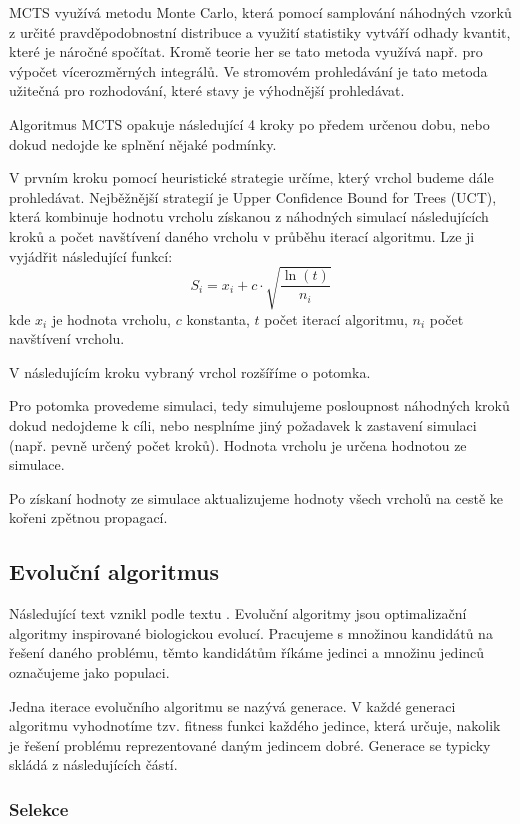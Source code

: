 MCTS využívá metodu Monte Carlo, která pomocí samplování náhodných vzorků z  určité pravděpodobnostní distribuce a využití statistiky vytváří odhady kvantit, které je náročné spočítat. Kromě teorie her se tato metoda využívá např. pro výpočet vícerozměrných integrálů. Ve stromovém prohledávání je tato metoda užitečná pro rozhodování, které stavy je výhodnější prohledávat.

Algoritmus MCTS opakuje následující 4 kroky po předem určenou dobu, nebo dokud nedojde ke splnění nějaké podmínky.

V prvním kroku pomocí heuristické strategie určíme, který vrchol budeme dále prohledávat. Nejběžnější strategií je Upper Confidence Bound for Trees (UCT), která kombinuje hodnotu vrcholu získanou z náhodných simulací následujících kroků a počet navštívení daného vrcholu v průběhu iterací algoritmu. Lze ji vyjádřit následující funkcí:
\begin{equation}
    S_i = x_i + c \cdot \sqrt{\frac{\ln(t)}{n_i}}
\end{equation}
kde $x_i$ je hodnota vrcholu, $c$ konstanta, $t$ počet iterací algoritmu, $n_i$ počet navštívení vrcholu.

V následujícím kroku vybraný vrchol rozšíříme o potomka.

Pro potomka provedeme simulaci, tedy simulujeme posloupnost náhodných kroků dokud nedojdeme k cíli, nebo nesplníme jiný požadavek k zastavení simulaci (např. pevně určený počet kroků). Hodnota vrcholu je určena hodnotou ze simulace.

Po získaní hodnoty ze simulace aktualizujeme hodnoty všech vrcholů na cestě ke kořeni zpětnou propagací.


\subsection{Evoluční algoritmus}

Následující text vznikl podle textu \citep{pilatEvolucniAlgoritmy}.
Evoluční algoritmy jsou optimalizační algoritmy inspirované biologickou evolucí. Pracujeme s množinou kandidátů na řešení daného problému, těmto kandidátům říkáme jedinci a množinu jedinců označujeme jako populaci. 

Jedna iterace evolučního algoritmu se nazývá generace. V každé generaci algoritmu vyhodnotíme tzv. fitness funkci každého jedince, která určuje, nakolik je řešení problému reprezentované daným jedincem dobré. Generace se typicky skládá z následujících částí.

\subsubsection*{Selekce}

